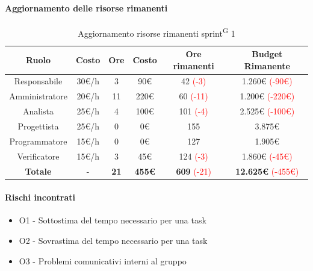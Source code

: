\documentclass[a4paper, 11pt]{article}
\newcommand{\subsubsubsection}[1]{\paragraph{#1}}
\renewcommand{\arraystretch}{1.4} %
\begin{document}
\subsubsubsection{Aggiornamento delle risorse rimanenti}
\begin{table}[H]
    \centering
    \renewcommand{\arraystretch}{1.5}
    
    \begin{tabular}{|c|c|c|c|c|c|}
        \hline
        \textcolor{AccentColor}{\textbf{Ruolo}} &
        \textcolor{AccentColor}{\textbf{Costo}} &
        \textcolor{AccentColor}{\textbf{Ore}} &
        \textcolor{AccentColor}{\textbf{Costo}} &
        \textcolor{AccentColor}{\textbf{Ore rimanenti}} &
        \textcolor{AccentColor}{\textbf{Budget Rimanente}} \\ \hline
        
        Responsabile & 30€/h & 3 & 90€ & 42 \textcolor{red}{(-3)} & 1.260€ \textcolor{red}{(-90€)}\\ \hline
        
        Amministratore & 20€/h & 11 & 220€ & 60 \textcolor{red}{(-11)} & 1.200€ \textcolor{red}{(-220€)} \\ \hline
        
        Analista & 25€/h & 4 & 100€ & 101 \textcolor{red}{(-4)} & 2.525€ \textcolor{red}{(-100€)}\\ \hline
        
        Progettista & 25€/h & 0 & 0€ & 155 & 3.875€ \\ \hline
        
        Programmatore & 15€/h & 0 & 0€ & 127 & 1.905€ \\ \hline
        
        Verificatore & 15€/h & 3 & 45€ & 124 \textcolor{red}{(-3)}& 1.860€ \textcolor{red}{(-45€)} \\ \hline
        
        \textbf{Totale} & - & \textbf{21} & \textbf{455€} & \textbf{609} \textcolor{red}{(-21)} & \textbf{12.625€} \textcolor{red}{(-455€)}\\ \hline
    \end{tabular}
    \caption{Aggiornamento risorse rimanenti sprint\textsuperscript{G} 1}
\end{table}
\subsubsubsection{Rischi incontrati}
\begin{itemize}
  \item O1 - Sottostima del tempo necessario per una task
  \item O2 - Sovrastima del tempo necessario per una task
  \item O3 - Problemi comunicativi interni al gruppo
\end{itemize}
\end{document}
